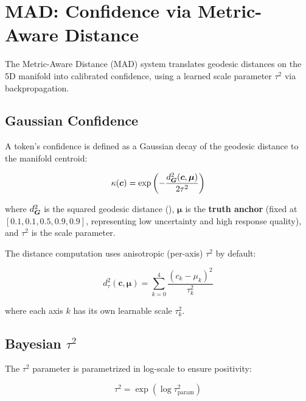 
\section{MAD: Confidence via Metric-Aware Distance}
\label{sec:mad}

The Metric-Aware Distance (MAD) system translates geodesic distances on
the 5D manifold into calibrated confidence, using a learned scale
parameter $\tau^2$ via backpropagation.

\subsection{Gaussian Confidence}

A token's confidence is defined as a Gaussian decay of the geodesic
distance to the manifold centroid:

\begin{equation}
    \kappa(\bm{c}) = \exp\left(-\frac{d_{\bm{G}}^2(\bm{c}, \bm{\mu})}{2\tau^2}\right)
    \label{eq:mad_conf}
\end{equation}

where $d_{\bm{G}}^2$ is the squared geodesic distance (),
$\bm{\mu}$ is the \textbf{truth anchor} (fixed at
$[0.1, 0.1, 0.5, 0.9, 0.9]$, representing low uncertainty and high
response quality), and $\tau^2$ is the scale parameter.

The distance computation uses anisotropic (per-axis) $\tau^2$ by default:

\begin{equation}
    d_{\tau}^2(\bm{c}, \bm{\mu}) = \sum_{k=0}^{4} \frac{(c_k - \mu_k)^2}{\tau^2_k}
\end{equation}

where each axis $k$ has its own learnable scale $\tau^2_k$.

\subsection{Bayesian $\tau^2$}

The $\tau^2$ parameter is parametrized in log-scale to ensure positivity:

\begin{equation}
    \tau^2 = \exp(\log \tau^2_{\text{param}})
\end{equation}

